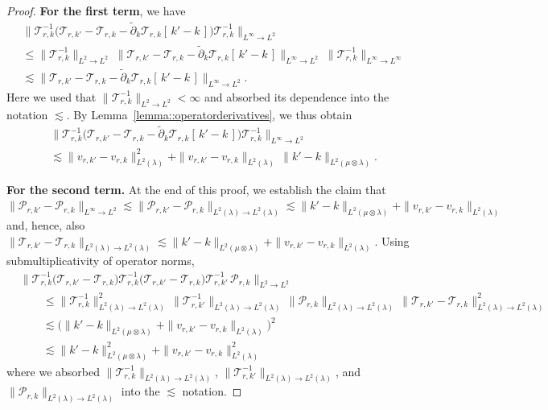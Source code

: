 \documentclass[11pt]{article}
\newcommand{\adk}{\widetilde{\partial}_k}
\theoremstyle{plain}
\begin{document}
\begin{proof}
\noindent \textbf{For the first term}, we have
\begin{align*}
  &\big\| \mathcal{T}_{r,k}^{-1}\Big(\mathcal{T}_{r,k'} - \mathcal{T}_{r,k} 
      - \adk \mathcal{T}_{r,k}[\,k' - k\,]\Big)\mathcal{T}_{r,k}^{-1}
   \big\|_{L^\infty \rightarrow L^2}  \\
  &\leq \|\mathcal{T}_{r,k}^{-1}\|_{L^2 \rightarrow L^2}\;
       \big\|\mathcal{T}_{r,k'} - \mathcal{T}_{r,k} 
          - \adk \mathcal{T}_{r,k}[\,k' - k\,]\big\|_{L^\infty \rightarrow L^2}\;
       \|\mathcal{T}_{r,k}^{-1}\|_{L^\infty \rightarrow L^\infty} \\
  &\lesssim \big\|\mathcal{T}_{r,k'} - \mathcal{T}_{r,k} 
          - \adk \mathcal{T}_{r,k}[\,k' - k\,]\big\|_{L^\infty \rightarrow L^2}.
\end{align*}
Here we used that $\|\mathcal{T}_{r,k}^{-1}\|_{L^2 \rightarrow L^2} < \infty$ and absorbed its dependence into the notation $\lesssim$. By Lemma~\ref{lemma::operatorderivatives}, we thus obtain
\begin{align*}
  &\big\| \mathcal{T}_{r,k}^{-1}\Big(\mathcal{T}_{r,k'} - \mathcal{T}_{r,k} 
      - \adk \mathcal{T}_{r,k}[\,k' - k\,]\Big)\mathcal{T}_{r,k}^{-1}
   \big\|_{L^\infty \rightarrow L^2} \\
  &\lesssim \|v_{r,k'} - v_{r,k}\|_{L^2(\lambda)}^2
          + \|v_{r,k'} - v_{r,k}\|_{L^2(\lambda)}\,
            \|k' - k\|_{L^2(\mu \otimes \lambda)}.
\end{align*}

\noindent \textbf{For the second term.} At the end of this proof, we establish the claim that $\|\mathcal{P}_{r,k'}-\mathcal{P}_{r,k}\|_{L^\infty\to L^2}  \lesssim \|\mathcal{P}_{r,k'}-\mathcal{P}_{r,k}\|_{L^2(\lambda)\to L^2(\lambda)} \lesssim \|k'-k\|_{L^2(\mu\otimes\lambda)}
    +  \|v_{r,k'}-v_{r,k}\|_{L^2(\lambda)}$ and, hence, also $\|\mathcal{T}_{r,k'}-\mathcal{T}_{r,k}\|_{L^2(\lambda)\to L^2(\lambda)} \lesssim \|k'-k\|_{L^2(\mu\otimes\lambda)}
    +  \|v_{r,k'}-v_{r,k}\|_{L^2(\lambda)}$. Using submultiplicativity of operator norms,
\begin{align*}
&\big\|\mathcal{T}_{r,k}^{-1}\big(\mathcal{T}_{r,k'}-\mathcal{T}_{r,k}\big)
  \mathcal{T}_{r,k}^{-1}\big(\mathcal{T}_{r,k'}-\mathcal{T}_{r,k}\big)
  \mathcal{T}_{r,k'}^{-1}\,\mathcal{P}_{r,k}\big\|_{L^2 \rightarrow L^2} \\
&\qquad\le 
\|\mathcal{T}_{r,k}^{-1}\|_{L^2(\lambda)\to L^2(\lambda)}^2\,
\|\mathcal{T}_{r,k'}^{-1}\|_{L^2(\lambda)\to L^2(\lambda)}\,
\|\mathcal{P}_{r,k}\|_{L^2(\lambda)\to L^2(\lambda)}\,
\|\mathcal{T}_{r,k'}-\mathcal{T}_{r,k}\|_{L^2(\lambda)\to L^2(\lambda)}^2 \\
&\qquad\lesssim 
\Big(\|k'-k\|_{L^2(\mu\otimes\lambda)}
      + \|v_{r,k'}-v_{r,k}\|_{L^2(\lambda)}\Big)^2\\
      &\qquad\lesssim 
\|k'-k\|_{L^2(\mu\otimes\lambda)}^2
      + \|v_{r,k'}-v_{r,k}\|_{L^2(\lambda)}^2
\end{align*}
where we absorbed $\|\mathcal{T}_{r,k}^{-1}\|_{L^2(\lambda)\to L^2(\lambda)}$, $\|\mathcal{T}_{r,k'}^{-1}\|_{L^2(\lambda)\to L^2(\lambda)}$, and $\|\mathcal{P}_{r,k}\|_{L^2(\lambda)\to L^2(\lambda)}$ into the $\lesssim$ notation.





\end{proof}
\end{document}
